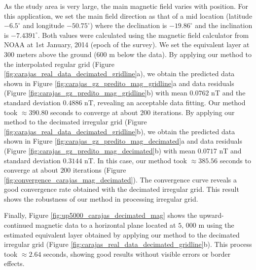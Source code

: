 As the study area is very large, the main magnetic field varies with position.
For this application, we set the main field direction as that of a mid location 
(latitude $-6.5^{\circ}$ and longitude $-50.75^{\circ}$) where the declination is $-19.86^{\circ}$ and
the inclination is $-7.4391^{\circ}$. Both values were calculated using the magnetic field calculator from NOAA
at 1st January, 2014 (epoch of the survey).
%
%
%
%
We set the equivalent layer at $300$ meters above the ground ($600$ m below the data).
By applying our method to the interpolated regular grid 
(Figure \ref{fig:carajas_real_data_decimated_gridline}a), we obtain the  predicted data shown in 
Figure \ref{fig:carajas_gz_predito_mag_gridline}a and data residuals 
(Figure \ref{fig:carajas_gz_predito_mag_gridline}b) with mean $0.0762$ nT and the standard deviation 
$0.4886$ nT, revealing an acceptable data fitting.
Our method took $\approx 390.80$ seconds to converge at about $200$ iterations.%
%
%
By applying our method to the decimated irregular grid 
(Figure \ref{fig:carajas_real_data_decimated_gridline}b), we obtain the predicted data shown in 
Figure \ref{fig:carajas_gz_predito_mag_decimated}a and data residuals 
(Figure \ref{fig:carajas_gz_predito_mag_decimated}b) with mean $0.0717$ nT and standard deviation 
$0.3144$ nT. In this case, our method took $\approx 385.56$ seconds 
to converge at about $200$ iterations (Figure \ref{fig:convergence_carajas_mag_decimated}).
The convergence curve reveals a good convergence rate obtained with the decimated 
irregular grid. This result shows the robustness of our method in processing irregular grid.


Finally, Figure \ref{fig:up5000_carajas_decimated_mag} shows the upward-continued magnetic data to a
horizontal plane located at $5, \,000$ m using the estimated equivalent layer obtained by applying our
method to the decimated irregular grid (Figure \ref{fig:carajas_real_data_decimated_gridline}b).
This process took $\approx 2.64$ seconds, showing good results without visible errors or border 
effects.